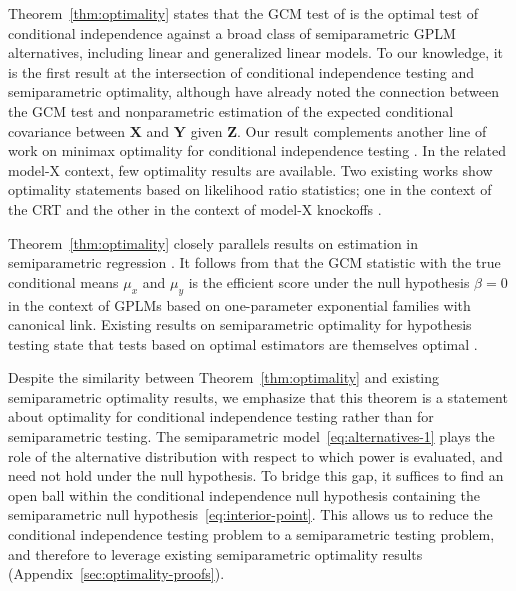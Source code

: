 \documentclass[12pt]{article}
\theoremstyle{definition}
\theoremstyle{remark}
\newcommand{\prx}{\bm X}								%
\newcommand{\prz}{\bm Z}								%
\newcommand{\pry}{{\bm Y}}								%
\begin{document}
	Theorem~\ref{thm:optimality} states that the GCM test of \citet{Shah2018} is the optimal test of conditional independence against a broad class of semiparametric GPLM alternatives, including linear and generalized linear models. To our knowledge, it is the first result at the intersection of conditional independence testing and semiparametric optimality, although \citet{Shah2018} have already noted the connection between the GCM test and nonparametric estimation of the expected conditional covariance between $\prx$ and $\pry$ given $\prz$. Our result complements another line of work on minimax optimality for conditional independence testing \citep{Canonne2018, Neykov2021, Kim2021}. In the related model-X context, few optimality results are available. Two existing works show optimality statements based on likelihood ratio statistics; one in the context of the CRT \citep{Katsevich2020a} and the other in the context of model-X knockoffs \citep{Spector2022a}.
	
	Theorem~\ref{thm:optimality} closely parallels results on estimation in semiparametric regression \citep{Robinson1988, Bickel1993,Donald1994, Hardle2000, Robins2001, VanDeGeer2014, Ning2017, Jankova2018a, Chernozhukov2018}. It follows from \citet{Bickel1993, Robins2001} that the GCM statistic with the true conditional means $\mu_x$ and $\mu_y$ is the efficient score under the null hypothesis $\beta = 0$ in the context of GPLMs based on one-parameter exponential families with canonical link. Existing results on semiparametric optimality for hypothesis testing state that tests based on optimal estimators are themselves optimal \citep{Choi1996, VDV1998, Kosorok2008}.
	
	Despite the similarity between Theorem~\ref{thm:optimality} and existing semiparametric optimality results, we emphasize that this theorem is a statement about optimality for conditional independence testing rather than for semiparametric testing. The semiparametric model~\eqref{eq:alternatives-1} plays the role of the alternative distribution with respect to which power is evaluated, and need not hold under the null hypothesis. To bridge this gap, it suffices to find an open ball within the conditional independence null hypothesis containing the semiparametric null hypothesis~\eqref{eq:interior-point}. This allows us to reduce the conditional independence testing problem to a semiparametric testing problem, and therefore to leverage existing semiparametric optimality results (Appendix~\ref{sec:optimality-proofs}).
	
\end{document}
